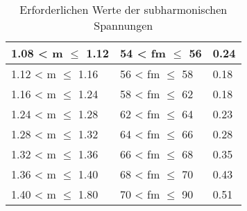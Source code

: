 \begin{table}[ht!]
\begin{tabular}{|l|l|l|}
		1.08 < m $\leq$ 1.12                                                                            & 54 < fm $\leq$ 56                                                                                                    & 0.24                        \\ \hline
		1.12 < m $\leq$ 1.16                                                                            & 56 < fm $\leq$ 58                                                                                                    & 0.18                        \\ \hline
		1.16 < m $\leq$ 1.24                                                                            & 58 < fm $\leq$ 62                                                                                                    & 0.18                        \\ \hline
		1.24 < m $\leq$ 1.28                                                                            & 62 < fm $\leq$ 64                                                                                                    & 0.23                        \\ \hline
		1.28 < m $\leq$ 1.32                                                                            & 64 < fm $\leq$ 66                                                                                                    & 0.28                        \\ \hline
		1.32 < m $\leq$ 1.36                                                                            & 66 < fm $\leq$ 68                                                                                                    & 0.35                        \\ \hline
		1.36 < m $\leq$ 1.40                                                                             & 68 < fm $\leq$ 70                                                                                                    & 0.43                        \\ \hline
		1.40 < m $\leq$ 1.80                                                                              & 70 < fm $\leq$ 90                                                                                                    & 0.51                        \\ \hline
	\end{tabular}
	\caption{Erforderlichen Werte der subharmonischen Spannungen}\label{tab:subharmonische_Spannung}
\end{table}

